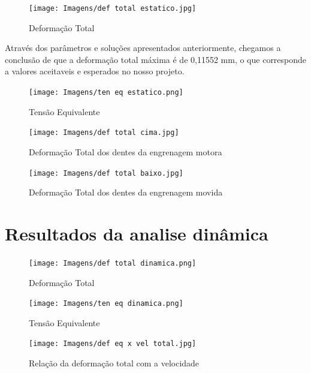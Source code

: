 \documentclass[deposito, acronym, symbols]{fei}
\begin{document}
\begin{figure}[!htb]
 \centering
    \caption{Deformação Total}
    \texttt{[image: Imagens/def total estatico.jpg]}
    \label{fig: Setup do Workbench}
 \end{figure}
 
 Através dos parâmetros e soluções apresentados anteriormente, chegamos a conclusão de que a deformação total máxima é de 0,11552 mm, o que corresponde a valores aceitaveis e esperados no nosso projeto. 
 
\begin{figure}[]
 \centering
    \caption{Tensão Equivalente}
    \texttt{[image: Imagens/ten eq estatico.png]}
    \label{fig: Setup do Workbench}
 \end{figure}
 
\begin{figure}[]
 \centering
    \caption{Deformação Total dos dentes da engrenagem motora}
    \texttt{[image: Imagens/def total cima.jpg]}
    \label{fig: Setup do Workbench}
 \end{figure}
 
\begin{figure}[]
 \centering
    \caption{Deformação Total dos dentes da engrenagem movida}
    \texttt{[image: Imagens/def total baixo.jpg]}
    \label{fig: Setup do Workbench}
 \end{figure}
 
\newpage

\section{Resultados da analise dinâmica}



\begin{figure}[]
 \centering
    \caption{Deformação Total}
    \texttt{[image: Imagens/def total dinamica.png]}
    \label{fig: Setup do Workbench}
 \end{figure}
 
\begin{figure}[]
 \centering
    \caption{Tensão Equivalente}
    \texttt{[image: Imagens/ten eq dinamica.png]}
    \label{fig: Setup do Workbench}
 \end{figure}
 
\begin{figure}[]
 \centering
    \caption{Relação da deformação total com a velocidade}
    \texttt{[image: Imagens/def eq x vel total.jpg]}
    \label{fig: Setup do Workbench}
 \end{figure}
 
\end{document}

